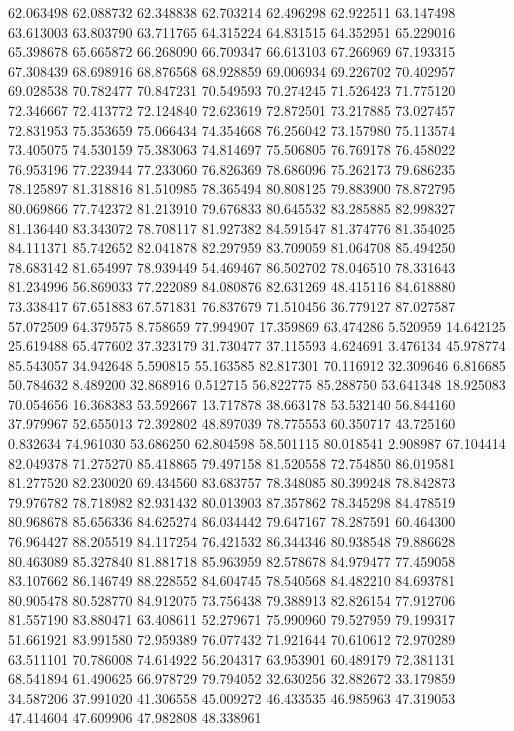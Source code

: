 62.063498
62.088732
62.348838
62.703214
62.496298
62.922511
63.147498
63.613003
63.803790
63.711765
64.315224
64.831515
64.352951
65.229016
65.398678
65.665872
66.268090
66.709347
66.613103
67.266969
67.193315
67.308439
68.698916
68.876568
68.928859
69.006934
69.226702
70.402957
69.028538
70.782477
70.847231
70.549593
70.274245
71.526423
71.775120
72.346667
72.413772
72.124840
72.623619
72.872501
73.217885
73.027457
72.831953
75.353659
75.066434
74.354668
76.256042
73.157980
75.113574
73.405075
74.530159
75.383063
74.814697
75.506805
76.769178
76.458022
76.953196
77.223944
77.233060
76.826369
78.686096
75.262173
79.686235
78.125897
81.318816
81.510985
78.365494
80.808125
79.883900
78.872795
80.069866
77.742372
81.213910
79.676833
80.645532
83.285885
82.998327
81.136440
83.343072
78.708117
81.927382
84.591547
81.374776
81.354025
84.111371
85.742652
82.041878
82.297959
83.709059
81.064708
85.494250
78.683142
81.654997
78.939449
54.469467
86.502702
78.046510
78.331643
81.234996
56.869033
77.222089
84.080876
82.631269
48.415116
84.618880
73.338417
67.651883
67.571831
76.837679
71.510456
36.779127
87.027587
57.072509
64.379575
8.758659
77.994907
17.359869
63.474286
5.520959
14.642125
25.619488
65.477602
37.323179
31.730477
37.115593
4.624691
3.476134
45.978774
85.543057
34.942648
5.590815
55.163585
82.817301
70.116912
32.309646
6.816685
50.784632
8.489200
32.868916
0.512715
56.822775
85.288750
53.641348
18.925083
70.054656
16.368383
53.592667
13.717878
38.663178
53.532140
56.844160
37.979967
52.655013
72.392802
48.897039
78.775553
60.350717
43.725160
0.832634
74.961030
53.686250
62.804598
58.501115
80.018541
2.908987
67.104414
82.049378
71.275270
85.418865
79.497158
81.520558
72.754850
86.019581
81.277520
82.230020
69.434560
83.683757
78.348085
80.399248
78.842873
79.976782
78.718982
82.931432
80.013903
87.357862
78.345298
84.478519
80.968678
85.656336
84.625274
86.034442
79.647167
78.287591
60.464300
76.964427
88.205519
84.117254
76.421532
86.344346
80.938548
79.886628
80.463089
85.327840
81.881718
85.963959
82.578678
84.979477
77.459058
83.107662
86.146749
88.228552
84.604745
78.540568
84.482210
84.693781
80.905478
80.528770
84.912075
73.756438
79.388913
82.826154
77.912706
81.557190
83.880471
63.408611
52.279671
75.990960
79.527959
79.199317
51.661921
83.991580
72.959389
76.077432
71.921644
70.610612
72.970289
63.511101
70.786008
74.614922
56.204317
63.953901
60.489179
72.381131
68.541894
61.490625
66.978729
79.794052
32.630256
32.882672
33.179859
34.587206
37.991020
41.306558
45.009272
46.433535
46.985963
47.319053
47.414604
47.609906
47.982808
48.338961
